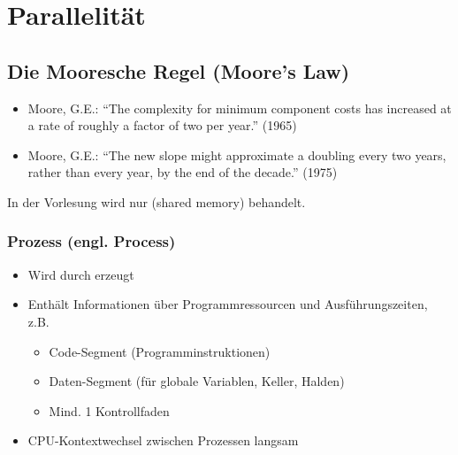 \section{Parallelität}
\subsection{Die Mooresche Regel (Moore's Law)}
\begin{itemize}
    \item Moore, G.E.:
    “The complexity for minimum component costs has increased at a rate of roughly a factor of two per year.” (1965)
    \item Moore, G.E.:
    “The new slope might approximate a doubling every two years, rather than every year, by the end of the decade.” (1975)
\end{itemize}


In der Vorlesung wird nur  (shared memory) behandelt.

\subsubsection{Prozess (engl. Process)}
\begin{itemize}
    \item Wird durch  erzeugt
    \item Enthält Informationen über Programmressourcen und Ausführungszeiten, z.B. 
    \begin{itemize}
        \item Code-Segment (Programminstruktionen)
        \item Daten-Segment (für globale Variablen, Keller, Halden)
        \item Mind. 1 Kontrollfaden
    \end{itemize}
    \item CPU-Kontextwechsel zwischen Prozessen langsam
\end{itemize}

\newpage
